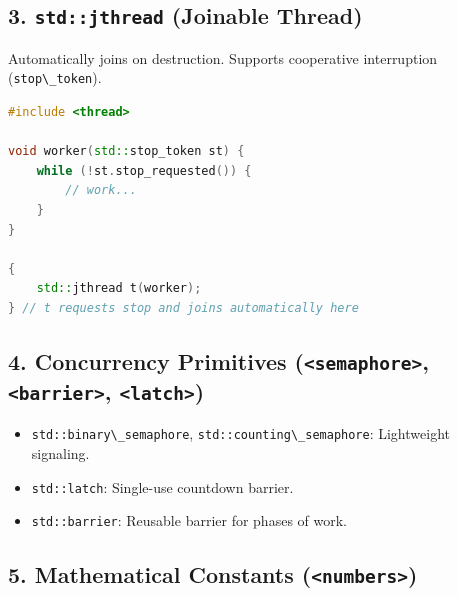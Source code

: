 \hypertarget{stdjthread-joinable-thread}{%
\subsection{\texorpdfstring{3. \texttt{std::jthread} (Joinable
Thread)}{3. std::jthread (Joinable Thread)}}\label{stdjthread-joinable-thread}}

Automatically joins on destruction. Supports cooperative interruption
(\passthrough{\lstinline!stop\_token!}).

\begin{lstlisting}[language={C++}]
#include <thread>

void worker(std::stop_token st) {
    while (!st.stop_requested()) {
        // work...
    }
}

{
    std::jthread t(worker);
} // t requests stop and joins automatically here
\end{lstlisting}

\hypertarget{concurrency-primitives-semaphore-barrier-latch}{%
\subsection{\texorpdfstring{4. Concurrency Primitives
(\texttt{\textless{}semaphore\textgreater{}},
\texttt{\textless{}barrier\textgreater{}},
\texttt{\textless{}latch\textgreater{}})}{4. Concurrency Primitives (\textless semaphore\textgreater, \textless barrier\textgreater, \textless latch\textgreater)}}\label{concurrency-primitives-semaphore-barrier-latch}}

\begin{itemize}
\tightlist
\item
  \passthrough{\lstinline!std::binary\_semaphore!},
  \passthrough{\lstinline!std::counting\_semaphore!}: Lightweight
  signaling.
\item
  \passthrough{\lstinline!std::latch!}: Single-use countdown barrier.
\item
  \passthrough{\lstinline!std::barrier!}: Reusable barrier for phases of
  work.
\end{itemize}

\hypertarget{mathematical-constants-numbers}{%
\subsection{\texorpdfstring{5. Mathematical Constants
(\texttt{\textless{}numbers\textgreater{}})}{5. Mathematical Constants (\textless numbers\textgreater)}}\label{mathematical-constants-numbers}}

